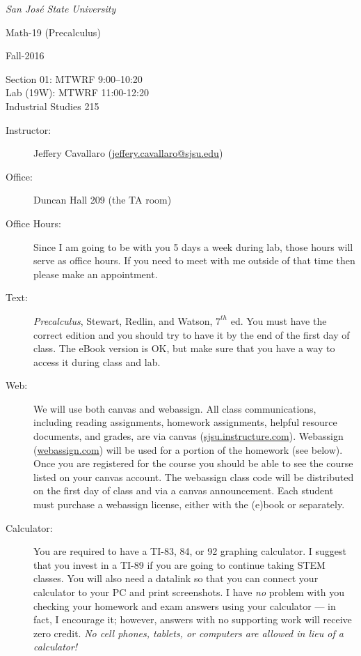 \documentclass[letterpaper,12pt,fleqn]{article}
\begin{document}
\begin{center}
\emph{San Jos\'{e} State University}

\Large{Math-19 (Precalculus)}\normalsize

\large{Fall-2016}\normalsize

Section 01: MTWRF 9:00--10:20 \\
Lab (19W): MTWRF 11:00-12:20 \\
Industrial Studies 215
\end{center}

\vspace{0.5in}

\begin{description}

\item[Instructor:] Jeffery Cavallaro (\url{jeffery.cavallaro@sjsu.edu})

\item[Office:] Duncan Hall 209 (the TA room)

\item[Office Hours:] Since I am going to be with you 5 days a week during lab,
those hours will serve as office hours. If you need to meet with me outside of
that time then please make an appointment.

\item[Text:] \emph{Precalculus}, Stewart, Redlin, and Watson, $7^{th}$ ed. You
    must have the correct edition and you should try to have it by the end of
    the first day of class. The eBook version is OK, but make sure that you
    have a way to access it during class and lab.

\item[Web:] We will use both canvas and webassign. All class communications,
    including reading assignments, homework assignments, helpful resource
    documents, and grades, are via canvas (\url{sjsu.instructure.com}). Webassign
    (\url{webassign.com}) will be used for a portion of the homework (see below).
    Once you are registered for the course you should be able to see the course
    listed on your canvas account. The webassign class code will be distributed
    on the first day of class and via a canvas announcement. Each student must
    purchase a webassign license, either with the (e)book or separately.

\item[Calculator:] You are required to have a TI-83, 84, or 92 graphing
    calculator. I suggest that you invest in a TI-89 if you are going to
    continue taking STEM classes. You will also need a datalink so that you
    can connect your calculator to your PC and print screenshots. I have
    \emph{no} problem with you checking your homework and exam answers using
    your calculator --- in fact, I encourage it; however, answers with no
    supporting work will receive zero credit. \emph{No cell phones, tablets,
    or computers are allowed in lieu of a calculator!}


\end{description}
\end{document}
